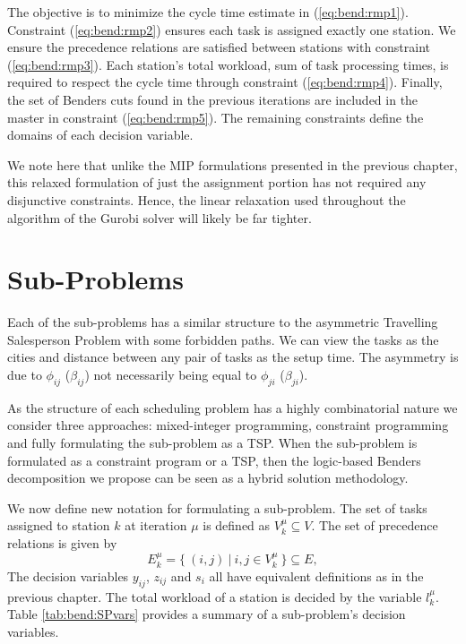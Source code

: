The objective is to minimize the cycle time estimate in (\ref{eq:bend:rmp1}).
Constraint (\ref{eq:bend:rmp2}) ensures each task
is assigned exactly one station.
We ensure the precedence relations are satisfied between stations with
constraint (\ref{eq:bend:rmp3}).
Each station's total workload, \ie sum of task processing times,
is required to respect the cycle time through constraint (\ref{eq:bend:rmp4}).
Finally, the set of Benders cuts found in the previous iterations are included
in the master in constraint (\ref{eq:bend:rmp5}).
The remaining constraints define the domains of
each decision variable.

We note here that unlike the MIP formulations presented in the
previous chapter, this relaxed formulation of just the
assignment portion has not required any disjunctive constraints.
Hence, the linear relaxation used throughout the \bab algorithm
of the Gurobi solver will likely be far tighter.


\section{Sub-Problems}
\label{sec:bend:SP}
Each of the sub-problems has a similar structure to
the asymmetric Travelling Salesperson Problem
with some forbidden paths.
We can view the tasks as the cities and distance
between any pair of tasks as the setup time.
The asymmetry is due to $\phi_{ij}$ ($\beta_{ij}$) not necessarily
being equal to $\phi_{ji}$ ($\beta_{ji}$).

As the structure of each scheduling problem has a 
highly combinatorial nature we consider 
three approaches:
mixed-integer programming, constraint
programming and fully formulating
the sub-problem as a TSP.
When the sub-problem is formulated
as a constraint program or a TSP,
then the logic-based Benders decomposition
we propose can be seen as a hybrid solution
methodology.

We now define new notation for formulating a
sub-problem.
The set of tasks assigned to station $k$
at iteration $\mu$ is defined as $V_k^\mu \subseteq V$.
The set of precedence relations is given by 
\[
	E_k^\mu = \{\: (i,j) \: | \: i,j \in V_k^\mu\:\} \subseteq E,
\]
The decision variables $y_{ij}$, $z_{ij}$ and $s_{i}$
all have equivalent definitions as in the previous chapter.
The total workload of a station is decided by the variable
$l_k^\mu$.
Table \ref{tab:bend:SPvars} provides a summary of a sub-problem's
decision variables.

